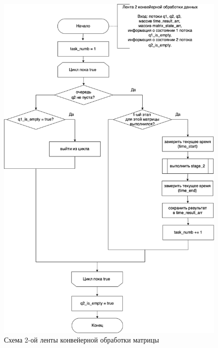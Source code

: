 \documentclass[a4paper,14pt, unknownkeysallowed]{extreport}
\begin{document}
\begin{figure}[h]
	\centering
	\includegraphics[scale=0.5]{img/parallel_stage_2.png}
	\caption{Схема 2-ой ленты конвейерной обработки матрицы}
	\label{fig:parallel_stage_2}
\end{figure} 

\clearpage
\end{document}
